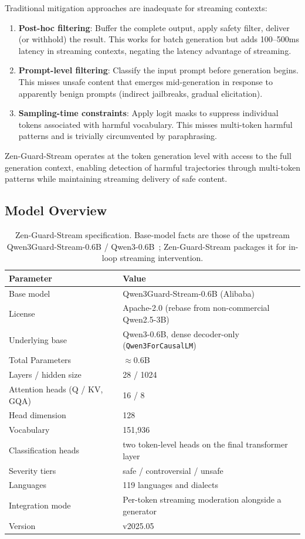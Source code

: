 \documentclass[11pt,a4paper]{article}
\begin{document}
Traditional mitigation approaches are inadequate for streaming contexts:

\begin{enumerate}
  \item \textbf{Post-hoc filtering}: Buffer the complete output, apply safety filter, deliver (or withhold) the result. This works for batch generation but adds 100--500ms latency in streaming contexts, negating the latency advantage of streaming.
  \item \textbf{Prompt-level filtering}: Classify the input prompt before generation begins. This misses unsafe content that emerges mid-generation in response to apparently benign prompts (indirect jailbreaks, gradual elicitation).
  \item \textbf{Sampling-time constraints}: Apply logit masks to suppress individual tokens associated with harmful vocabulary. This misses multi-token harmful patterns and is trivially circumvented by paraphrasing.
\end{enumerate}

Zen-Guard-Stream operates at the token generation level with access to the full generation context, enabling detection of harmful trajectories through multi-token patterns while maintaining streaming delivery of safe content.

\subsection{Model Overview}

\begin{table}[H]
\centering
\caption{Zen-Guard-Stream specification. Base-model facts are those of the upstream
Qwen3Guard-Stream-0.6B / Qwen3-0.6B~\cite{qwen3guard}; Zen-Guard-Stream packages it for in-loop
streaming intervention.}
\begin{tabular}{ll}
\toprule
\textbf{Parameter} & \textbf{Value} \\
\midrule
Base model & Qwen3Guard-Stream-0.6B (Alibaba) \\
License & Apache-2.0 (rebase from non-commercial Qwen2.5-3B) \\
Underlying base & Qwen3-0.6B, dense decoder-only (\texttt{Qwen3ForCausalLM}) \\
Total Parameters & $\approx$0.6B \\
Layers / hidden size & 28 / 1024 \\
Attention heads (Q / KV, GQA) & 16 / 8 \\
Head dimension & 128 \\
Vocabulary & 151{,}936 \\
Classification heads & two token-level heads on the final transformer layer \\
Severity tiers & safe / controversial / unsafe \\
Languages & 119 languages and dialects \\
Integration mode & Per-token streaming moderation alongside a generator \\
Version & v2025.05 \\
\bottomrule
\end{tabular}
\end{table}
\end{document}
